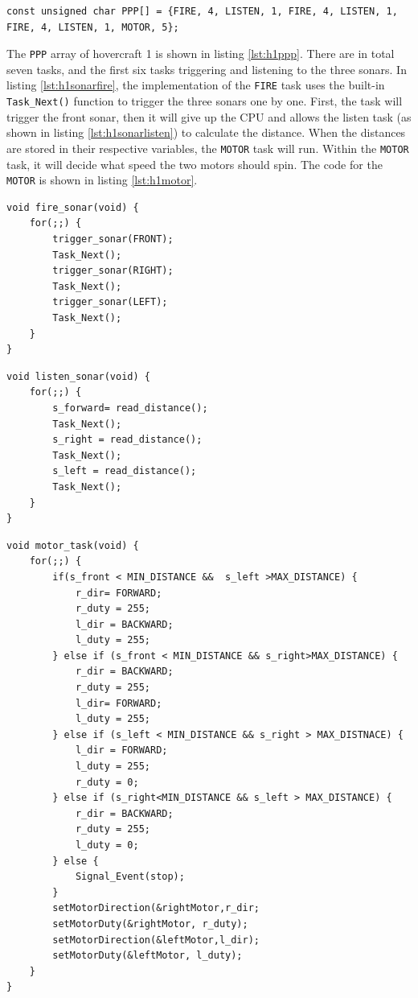 \begin{lstlisting}[float=th,label=lst:h1ppp,
                   caption={\texttt{PPP} array for hovercraft 1}]
const unsigned char PPP[] = {FIRE, 4, LISTEN, 1, FIRE, 4, LISTEN, 1, FIRE, 4, LISTEN, 1, MOTOR, 5};
\end{lstlisting}
The \texttt{PPP} array of hovercraft 1 is shown in listing \ref{lst:h1ppp}.
There are in total seven tasks, and the first six tasks triggering and listening
to the three sonars. In listing \ref{lst:h1sonarfire}, the implementation of the
\texttt{FIRE} task uses the built-in \texttt{Task\_Next()} function to trigger
the three sonars one by one. First, the task will trigger the front sonar, then
it will give up the CPU and allows the listen task (as shown in listing
\ref{lst:h1sonarlisten}) to calculate the distance. When the distances are
stored in their respective variables, the \texttt{MOTOR} task will run. Within
the \texttt{MOTOR} task, it will decide what speed the two motors should spin.
The code for the \texttt{MOTOR} is shown in listing \ref{lst:h1motor}.

\begin{lstlisting}[float=thp,label=lst:h1sonarfire,
                   caption={\texttt{FIRE} Task}]
void fire_sonar(void) {
	for(;;) {
		trigger_sonar(FRONT);
		Task_Next();
		trigger_sonar(RIGHT);
		Task_Next();
		trigger_sonar(LEFT);
		Task_Next();
	}
}
\end{lstlisting}

\begin{lstlisting}[label=lst:h1sonarlisten,float=tbh,
                   caption={\texttt{LISTEN} Task}]
void listen_sonar(void) {
	for(;;)	{
	    s_forward= read_distance();
	    Task_Next();
	    s_right = read_distance();
	    Task_Next();
	    s_left = read_distance();
	    Task_Next();
	}
}
\end{lstlisting}

\begin{lstlisting}[label=lst:h1motor,float=th,
                   caption={\texttt{MOTOR} Task}]
void motor_task(void) {
	for(;;) {
    	if(s_front < MIN_DISTANCE &&  s_left >MAX_DISTANCE) {
            r_dir= FORWARD;
            r_duty = 255;
            l_dir = BACKWARD;
            l_duty = 255;
   		} else if (s_front < MIN_DISTANCE && s_right>MAX_DISTANCE) {
            r_dir = BACKWARD;
            r_duty = 255;
            l_dir= FORWARD;
            l_duty = 255;					
    	} else if (s_left < MIN_DISTANCE && s_right > MAX_DISTNACE) {
            l_dir = FORWARD;
            l_duty = 255;
            r_duty = 0;
   	 	} else if (s_right<MIN_DISTANCE && s_left > MAX_DISTANCE) {
            r_dir = BACKWARD;
            r_duty = 255;
            l_duty = 0;
    	} else {
            Signal_Event(stop);
    	}
        setMotorDirection(&rightMotor,r_dir;
        setMotorDuty(&rightMotor, r_duty);
        setMotorDirection(&leftMotor,l_dir);
        setMotorDuty(&leftMotor, l_duty);
	}
}
\end{lstlisting}

